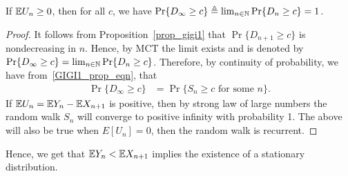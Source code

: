 \documentclass[a4paper,10pt,english]{article}
\begin{document}
\begin{cor} If $\mathbb{E} U_n \geq 0$, then for all $c$, we have 
$\Pr\{D_{\infty} \geq c\} \triangleq \lim_{n \in \mathbb{N}}\Pr\{D_{n} \geq c\} = 1$.
\end{cor}
\begin{proof}
It follows from Proposition~\ref{prop_gigi1} that $\Pr\{D_{n+1} \geq c\}$ is nondecreasing in $n$. 
Hence, by MCT the limit exists and is denoted by $\Pr\{D_{\infty} \geq c\}=\lim_{n \in \mathbb{N}}\Pr\{D_{n} \geq c\}$. 
Therefore, by continuity of probability, we have from~\eqref{GIGI1_prop_eqn}, that
\begin{align}
\label{random_walk_gigi1}
\Pr\{D_{\infty} \geq c\} &= \Pr\{S_n \geq c \text{ for some }n\}.
\end{align}
If $\mathbb{E} U_n = \mathbb{E} Y_n - \mathbb{E} X_{n+1}$ is positive, then by strong law of large numbers the random walk $S_n$ will converge to positive infinity with probability 1. 
The above will also be true when $E[U_n] = 0$, then the random walk is recurrent.
\end{proof}
\begin{rem} Hence, we get that $\mathbb{E} Y_n< \mathbb{E} X_{n+1}$ implies the existence of a stationary distribution.
\end{rem}
\end{document}
